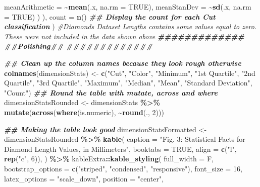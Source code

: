 \documentclass[
]{article}
\newenvironment{Shaded}{\begin{snugshade}}{\end{snugshade}}
\newcommand{\AttributeTok}[1]{\textcolor[rgb]{0.13,0.29,0.53}{#1}}
\newcommand{\CommentTok}[1]{\textcolor[rgb]{0.56,0.35,0.01}{\textit{#1}}}
\newcommand{\ConstantTok}[1]{\textcolor[rgb]{0.56,0.35,0.01}{#1}}
\newcommand{\DecValTok}[1]{\textcolor[rgb]{0.00,0.00,0.81}{#1}}
\newcommand{\DocumentationTok}[1]{\textcolor[rgb]{0.56,0.35,0.01}{\textbf{\textit{#1}}}}
\newcommand{\FunctionTok}[1]{\textcolor[rgb]{0.13,0.29,0.53}{\textbf{#1}}}
\newcommand{\NormalTok}[1]{#1}
\newcommand{\OtherTok}[1]{\textcolor[rgb]{0.56,0.35,0.01}{#1}}
\newcommand{\SpecialCharTok}[1]{\textcolor[rgb]{0.81,0.36,0.00}{\textbf{#1}}}
\newcommand{\StringTok}[1]{\textcolor[rgb]{0.31,0.60,0.02}{#1}}
\begin{document}
\begin{Shaded}
\begin{Highlighting}[]
        \AttributeTok{meanArithmetic =} \SpecialCharTok{\textasciitilde{}}\FunctionTok{mean}\NormalTok{(.x, }\AttributeTok{na.rm =} \ConstantTok{TRUE}\NormalTok{),}
        \AttributeTok{meanStanDev =} \SpecialCharTok{\textasciitilde{}}\FunctionTok{sd}\NormalTok{(.x, }\AttributeTok{na.rm =} \ConstantTok{TRUE}\NormalTok{)}
\NormalTok{      )}
\NormalTok{    ),}
    \AttributeTok{count =} \FunctionTok{n}\NormalTok{()                                                  }\DocumentationTok{\#\# Display the count for each Cut classification}
\NormalTok{  )}
\CommentTok{\#Diamonds Dataset Lengths contains some values equal to zero. These were not included in the data shown above}
\DocumentationTok{\#\#\#\#\#\#\#\#\#\#\#\#\#}
\DocumentationTok{\#\#Polishing\#\#}
\DocumentationTok{\#\#\#\#\#\#\#\#\#\#\#\#\#}

\DocumentationTok{\#\# Clean up the column names because they look rough otherwise}
\FunctionTok{colnames}\NormalTok{(dimensionStats) }\OtherTok{\textless{}{-}} \FunctionTok{c}\NormalTok{(}\StringTok{"Cut"}\NormalTok{, }\StringTok{"Color"}\NormalTok{, }\StringTok{"Minimum"}\NormalTok{, }\StringTok{"1st Quartile"}\NormalTok{, }\StringTok{"2nd Quartile"}\NormalTok{, }\StringTok{"3rd Quartile"}\NormalTok{, }\StringTok{"Maximum"}\NormalTok{, }\StringTok{"Median"}\NormalTok{, }\StringTok{"Mean"}\NormalTok{, }\StringTok{"Standard Deviation"}\NormalTok{, }\StringTok{"Count"}\NormalTok{)}
\DocumentationTok{\#\# Round the table with mutate, across and where}
\NormalTok{dimensionStatsRounded }\OtherTok{\textless{}{-}}\NormalTok{ dimensionStats }\SpecialCharTok{\%\textgreater{}\%}
  \FunctionTok{mutate}\NormalTok{(}\FunctionTok{across}\NormalTok{(}\FunctionTok{where}\NormalTok{(is.numeric), }\SpecialCharTok{\textasciitilde{}}\FunctionTok{round}\NormalTok{(., }\DecValTok{2}\NormalTok{)))}

\DocumentationTok{\#\# Making the table look good}
\NormalTok{dimensionStatsFormatted }\OtherTok{\textless{}{-}}\NormalTok{ dimensionStatsRounded }\SpecialCharTok{\%\textgreater{}\%}
  \FunctionTok{kable}\NormalTok{(}
    \AttributeTok{caption =} \StringTok{"Fig. 3: Statistical Facts for Diamond Length Values, in Millimeters"}\NormalTok{,}
    \AttributeTok{booktabs =} \ConstantTok{TRUE}\NormalTok{,}
    \AttributeTok{align =} \FunctionTok{c}\NormalTok{(}\StringTok{"l"}\NormalTok{, }\FunctionTok{rep}\NormalTok{(}\StringTok{"c"}\NormalTok{, }\DecValTok{6}\NormalTok{)),}
\NormalTok{  ) }\SpecialCharTok{\%\textgreater{}\%}
\NormalTok{  kableExtra}\SpecialCharTok{::}\FunctionTok{kable\_styling}\NormalTok{(}
    \AttributeTok{full\_width =}\NormalTok{ F,}
    \AttributeTok{bootstrap\_options =} \FunctionTok{c}\NormalTok{(}\StringTok{"striped"}\NormalTok{, }\StringTok{"condensed"}\NormalTok{, }\StringTok{"responsive"}\NormalTok{),}
    \AttributeTok{font\_size =} \DecValTok{16}\NormalTok{,}
    \AttributeTok{latex\_options =} \StringTok{"scale\_down"}\NormalTok{,}
    \AttributeTok{position =} \StringTok{"center"}\NormalTok{,}
    

\end{Highlighting}
\end{Shaded}
\end{document}
